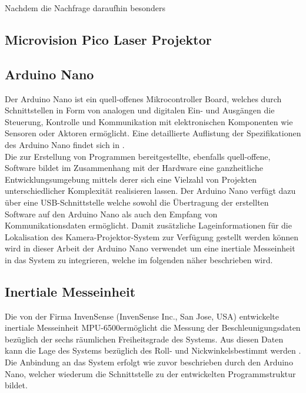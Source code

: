Nachdem die Nachfrage daraufhin besonders 

\subsection{Microvision Pico Laser Projektor}

\subsection{Arduino Nano}
\label{chap.arduino}
Der Arduino Nano ist ein quell-offenes Mikrocontroller Board, welches durch Schnittstellen in Form von analogen und digitalen Ein- und Ausgängen die Steuerung, Kontrolle und Kommunikation mit elektronischen Komponenten wie Sensoren oder Aktoren ermöglicht. Eine detaillierte Auflistung der Spezifikationen des Arduino Nano findet sich in .\\
Die zur Erstellung von Programmen bereitgestellte, ebenfalls quell-offene, Software bildet im Zusammenhang mit der Hardware eine ganzheitliche Entwicklungsumgebung mittels derer sich eine Vielzahl von Projekten unterschiedlicher Komplexität realisieren lassen. Der Arduino Nano verfügt dazu über eine USB-Schnittstelle welche sowohl die Übertragung der erstellten Software auf den Arduino Nano als auch den Empfang von Kommunikationsdaten ermöglicht. Damit zusätzliche Lageinformationen für die Lokalisation des Kamera-Projektor-System zur Verfügung gestellt werden können wird in dieser Arbeit der Arduino Nano verwendet um eine inertiale Messeinheit in das System zu integrieren, welche im folgenden näher beschrieben wird.


\subsection{Inertiale Messeinheit}
\label{chap.imu}
Die von der Firma InvenSense (InvenSense Inc., San Jose, USA) entwickelte inertiale Messeinheit MPU-6500\texttrademark \space ermöglicht die Messung der Beschleunigungsdaten bezüglich der sechs räumlichen Freiheitsgrade des Systems. Aus diesen Daten kann die Lage des Systems bezüglich des Roll- und Nickwinkels\red[footnote] bestimmt werden \cite{IMU}. Die Anbindung an das System erfolgt wie zuvor beschrieben durch den Arduino Nano, welcher wiederum die Schnittstelle zu der entwickelten Programmstruktur bildet.

